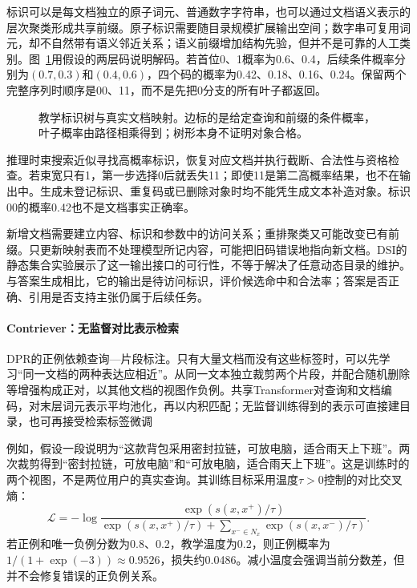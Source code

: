 标识可以是每文档独立的原子词元、普通数字字符串，也可以通过文档语义表示的层次聚类形成共享前缀。原子标识需要随目录规模扩展输出空间；数字串可复用词元，却不自然带有语义邻近关系；语义前缀增加结构先验，但并不是可靠的人工类别。图~\ref{fig:rs-search-identifiers}用假设的两层码说明解码。若首位0、1概率为0.6、0.4，后续条件概率分别为$(0.7,0.3)$和$(0.4,0.6)$，四个码的概率为0.42、0.18、0.16、0.24。保留两个完整序列时顺序是00、11，而不是先把0分支的所有叶子都返回。

\begin{figure}[htbp]
 \centering
 
 \caption{教学标识树与真实文档映射。边标的是给定查询和前缀的条件概率，叶子概率由路径相乘得到；树形本身不证明对象合格。}
 \label{fig:rs-search-identifiers}
\end{figure}

推理时束搜索近似寻找高概率标识，恢复对应文档并执行截断、合法性与资格检查。若束宽只有1，第一步选择0后就丢失11；即使11是第二高概率结果，也不在输出中。生成未登记标识、重复码或已删除对象时均不能凭生成文本补造对象。标识00的概率0.42也不是文档事实正确率。

新增文档需要建立内容、标识和参数中的访问关系；重排聚类又可能改变已有前缀。只更新映射表而不处理模型所记内容，可能把旧码错误地指向新文档。DSI的静态集合实验展示了这一输出接口的可行性，不等于解决了任意动态目录的维护。与答案生成相比，它的输出是待访问标识，评价候选命中和合法率；答案是否正确、引用是否支持主张仍属于后续任务。

\Needspace{100mm}
\paragraph{Contriever：无监督对比表示检索}
\label{sec:rs-search-contriever}

DPR的正例依赖查询—片段标注。只有大量文档而没有这些标签时，可以先学习“同一文档的两种表达应相近”。从同一文本独立裁剪两个片段，并配合随机删除等增强构成正对，以其他文档的视图作负例。共享Transformer对查询和文档编码，对末层词元表示平均池化，再以内积匹配；无监督训练得到的表示可直接建目录，也可再接受检索标签微调

例如，假设一段说明为“这款背包采用密封拉链，可放电脑，适合雨天上下班”。两次裁剪得到“密封拉链，可放电脑”和“可放电脑，适合雨天上下班”。这是训练时的两个视图，不是两位用户的真实查询。其训练目标采用温度$\tau>0$控制的对比交叉熵：
\begin{equation}
 \mathcal L=-\log
 \frac{\exp(s(x,x^+)/\tau)}
 {\exp(s(x,x^+)/\tau)+\sum_{x^-\in N_x}\exp(s(x,x^-)/\tau)} .
 \label{eq:rs-search-contriever-objective}
\end{equation}
若正例和唯一负例分数为0.8、0.2，教学温度为0.2，则正例概率为$1/(1+\exp(-3))\approx0.9526$，损失约0.0486。减小温度会强调当前分数差，但并不会修复错误的正负例关系。

